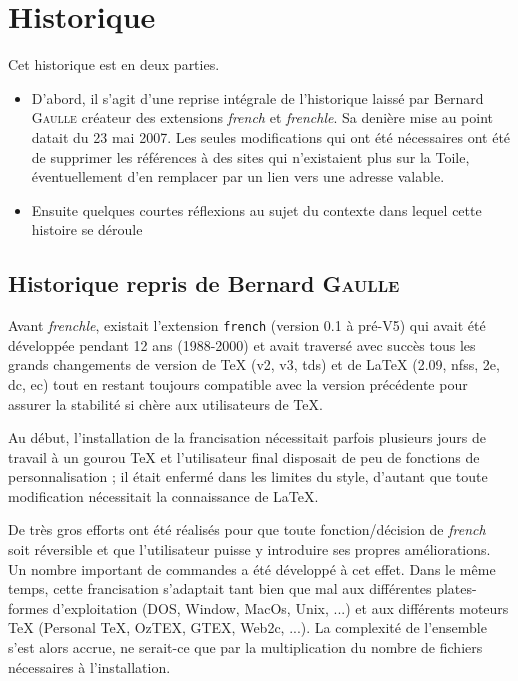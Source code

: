 \documentclass[a4paper,12pt,openright]{article}
\begin{document}
\section {Historique} \label{histo} 
Cet historique est en deux parties.
\begin{itemize}
\item D'abord, il s'agit d'une reprise intégrale de l'historique laissé par Bernard \textsc{Gaulle} 
créateur des extensions \textsl{french} et \textit{frenchle}. Sa denière mise au point datait
du 23 mai 2007. Les seules modifications qui ont été nécessaires ont été de supprimer les
références à des sites qui n'existaient plus sur la Toile, éventuellement d'en remplacer
par un lien vers une adresse valable.
\item Ensuite quelques courtes réflexions au sujet du contexte dans lequel cette histoire
se déroule
\end{itemize}
\subsection{Historique repris de Bernard \textsc{Gaulle}}
Avant \textit{frenchle}, existait l’extension \texttt{french} (version 0.1 à pré-V5) qui avait
été développée pendant 12 ans (1988-2000) et avait traversé avec succès tous
les grands changements de version de \TeX{} (v2, v3, tds) et de \LaTeX{} (2.09, nfss,
2e, dc, ec) tout en restant toujours compatible avec la version précédente pour
assurer la stabilité si chère aux utilisateurs de \TeX.

Au début, l’installation de la francisation nécessitait parfois plusieurs jours
de travail à un gourou \TeX{} et l’utilisateur final disposait de peu de fonctions de
personnalisation ; il était enfermé dans les limites du style, d’autant que toute
modification nécessitait la connaissance de \LaTeX.

De très gros efforts ont été réalisés pour que toute fonction/décision de
\textsl{french} soit réversible et que l’utilisateur puisse y introduire ses propres améliorations.
Un nombre important de commandes a été développé à cet effet.
Dans le même temps, cette francisation s’adaptait tant bien que mal aux
différentes plates-formes d’exploitation (DOS, Window, MacOs, Unix, ...) et
aux différents moteurs \TeX{} (Personal \-\TeX, OzTEX, GTEX, Web2c, ...). La complexité 
de l’ensemble s’est alors accrue, ne serait-ce que par la multiplication
du nombre de fichiers nécessaires à l’installation.
\end{document}
